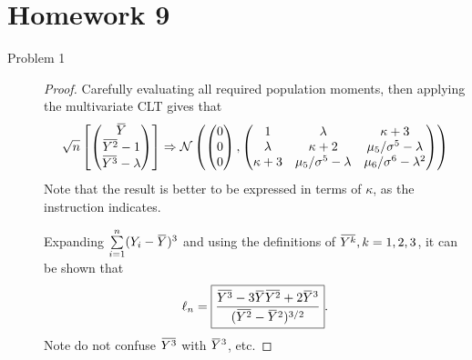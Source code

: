 \documentclass{article}
\newcommand{\overbar}[1]{\mkern 1.5mu\overline{\mkern-1.5mu#1\mkern-1.5mu}\mkern 1.5mu}
\theoremstyle{definition}
\theoremstyle{plain}
\theoremstyle{remark}
\begin{document}
\newpage

\section*{Homework 9}
\begin{description}
\item[Problem 1]
\begin{proof}
Carefully evaluating all required population moments, then applying the multivariate CLT
gives that
\begin{equation}\label{eq2}
\sqrt{n}\left[
\begin{pmatrix}
\overbar{Y} \\
\overbar{Y^2} - 1 \\
\overbar{Y^3} - \lambda
\end{pmatrix}\right]
\Rightarrow
\mathcal{N}\left(
\begin{pmatrix}
0 \\
0 \\
0
\end{pmatrix}, 
\begin{pmatrix}
1 & \lambda & \kappa + 3 \\
\lambda & \kappa + 2  & \mu_5/\sigma^5 - \lambda \\
\kappa + 3 & \mu_5/\sigma^5 - \lambda & \mu_6/\sigma^6 - \lambda^2
\end{pmatrix}\right)
\end{equation}
Note that the result is better to be expressed in terms of $\kappa$, as the instruction indicates. 

Expanding $\sum\limits_{i = 1}^n (Y_i - \overbar{Y})^3$ and using the definitions of $\overbar{Y^k}, k = 1, 2, 3$, it can be shown 
that 
\begin{equation}\label{eq3}
\ell_n = \boxed{\frac{\overbar{Y^3} - 3\overbar{Y}\overbar{Y^2} + 2\overbar{Y}^3}{(\overbar{Y^2} - 
\overbar{Y}^2)^{3/2}}}.
\end{equation}
Note do not confuse $\overbar{Y^3}$ with $\overbar{Y}^3$, etc. 


\end{proof}
\end{description}
\end{document}
